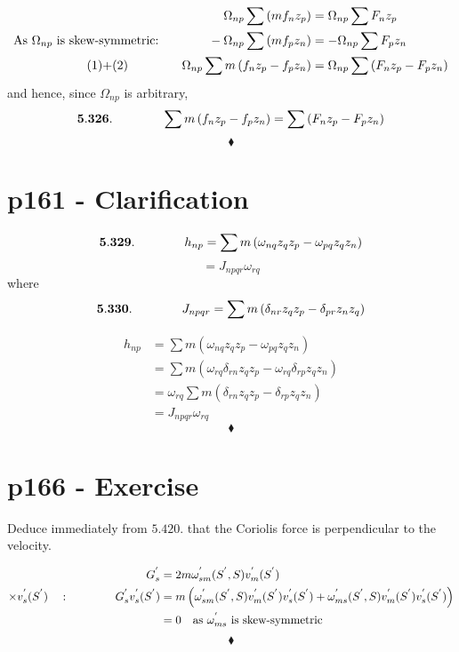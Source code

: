 \begin{align}
\Omega_{np}\sum \left(mf_nz_p\right)&= \Omega_{np}\sum F_nz_p \\
\text{As }\Omega_{np}\text{ is skew-symmetric:}\quad\quad\quad\quad -\Omega_{np}\sum \left(mf_pz_n\right)&= -\Omega_{np}\sum F_pz_n \\
\text{(1)+(2) }\quad\quad\quad\quad \Omega_{np}\sum m\left(f_nz_p-f_pz_n\right)&= \Omega_{np}\sum\left( F_nz_p -F_pz_n\right)
\end{align}
and hence, since $\Omega_{np}$ is arbitrary,
$$\mathbf{5.326.}\quad\quad\quad\quad \sum m\left(f_nz_p-f_pz_n\right)= \sum \left(F_nz_p-F_pz_n \right)$$
$$\blacklozenge$$
\newpage

\section{p161 - Clarification}
\begin{tcolorbox}
$$\mathbf{5.329.}\quad\quad\quad\quad h_{np}=\sum m\left(\omega_{nq} z_q z_p -\omega_{pq} z_qz_n\right)$$
$$= J_{npqr}\omega_{rq}$$
where
$$\mathbf{5.330.}\quad\quad\quad\quad J_{npqr}= \sum m\left(\delta_{nr}z_qz_p-\delta_{pr}z_nz_q \right)$$
\end{tcolorbox}
\begin{align}
h_{np}&=\sum m\left(\omega_{nq} z_q z_p -\omega_{pq} z_qz_n\right)\\
&=\sum m\left(\omega_{rq}\delta_{rn} z_q z_p -\omega_{rq} \delta_{rp}z_qz_n\right)\\
&=\omega_{rq}\sum m\left(\delta_{rn} z_q z_p -\delta_{rp}z_qz_n\right)\\
&=J_{npqr}\omega_{rq}
\end{align}
$$\blacklozenge$$
\newpage


\section{p166 - Exercise}
\begin{tcolorbox}
Deduce immediately from $\mathbf{5.420.}$ that the Coriolis force is perpendicular to the velocity.
\end{tcolorbox}
\begin{align}
G^{'}_s &= 2m\omega^{'}_{sm}(S^{'},S)v^{'}_m(S^{'})\\
\times v^{'}_s(S^{'})\quad : \quad\quad\quad\quad G^{'}_s v^{'}_s(S^{'})&=m\left(\omega^{'}_{sm}(S^{'},S)v^{'}_m(S^{'})v^{'}_s(S^{'})+\omega^{'}_{ms}(S^{'},S)v^{'}_m(S^{'})v^{'}_s(S^{'})\right)\\
&=0\quad\text{as }\omega^{'}_{ms}\text{ is skew-symmetric}
\end{align}
$$\blacklozenge$$
\newpage

